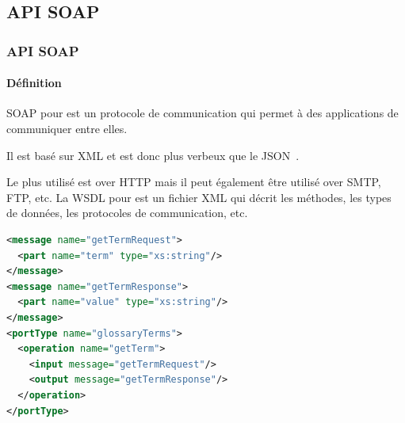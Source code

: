 \documentclass{beamer}
\begin{document}
    \subsection{API SOAP}\label{subsec:api-soap}

    \begin{frame}[fragile]
        \transdissolve
        \frametitle{API SOAP}
        \framesubtitle{Définition}
        SOAP pour  est un protocole de communication qui permet à des applications de communiquer entre elles.

        Il est basé sur XML et est donc plus verbeux que le JSON~.

        Le plus utilisé est over HTTP mais il peut également être utilisé over SMTP, FTP, etc.
        \bigbreak
        La WSDL pour  est un fichier XML qui décrit les méthodes, les types de données, les protocoles de communication, etc.
        \begin{lstlisting}[language=xml,basicstyle=\ttfamily\tiny]
<message name="getTermRequest">
  <part name="term" type="xs:string"/>
</message>
<message name="getTermResponse">
  <part name="value" type="xs:string"/>
</message>
<portType name="glossaryTerms">
  <operation name="getTerm">
    <input message="getTermRequest"/>
    <output message="getTermResponse"/>
  </operation>
</portType>
        \end{lstlisting}
    \end{frame}
\end{document}
